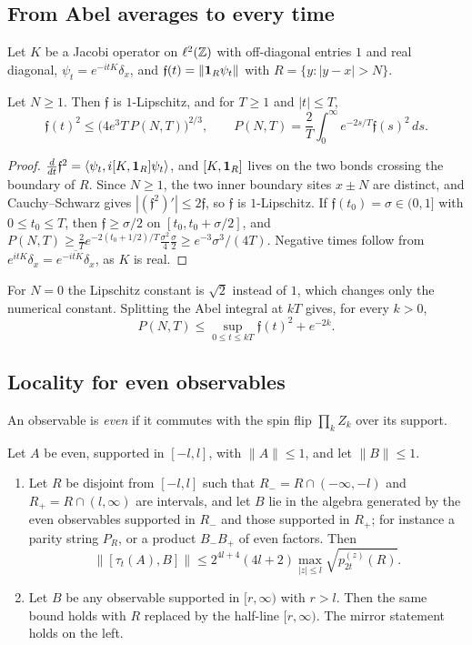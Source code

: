 \subsection{From Abel averages to every time}

Let $K$ be a Jacobi operator on $\ell^2(\mathbb Z)$ with off-diagonal entries $1$ and real diagonal, $\psi_t=e^{-itK}\delta_x$, and $\mathfrak f(t)=\|\mathbf 1_R\psi_t\|$ with $R=\{y:|y-x|>N\}$.

\begin{lemma}\label{lem:abel}
Let $N\ge1$. Then $\mathfrak f$ is $1$-Lipschitz, and for $T\ge1$ and $|t|\le T$,
\[
\mathfrak f(t)^2\le\bigl(4e^3T\,P(N,T)\bigr)^{2/3},\qquad P(N,T)=\frac2T\int_0^\infty e^{-2s/T}\mathfrak f(s)^2\,ds .
\]
\end{lemma}

\begin{proof}
$\frac d{dt}\mathfrak f^2=\langle\psi_t,i[K,\mathbf 1_R]\psi_t\rangle$, and $[K,\mathbf 1_R]$ lives on the two bonds crossing the boundary of $R$. Since $N\ge1$, the two inner boundary sites $x\pm N$ are distinct, and Cauchy--Schwarz gives $|(\mathfrak f^2)'|\le2\mathfrak f$, so $\mathfrak f$ is $1$-Lipschitz. If $\mathfrak f(t_0)=\sigma\in(0,1]$ with $0\le t_0\le T$, then $\mathfrak f\ge\sigma/2$ on $[t_0,t_0+\sigma/2]$, and $P(N,T)\ge\frac2Te^{-2(t_0+1/2)/T}\frac{\sigma^2}4\frac\sigma2\ge e^{-3}\sigma^3/(4T)$. Negative times follow from $e^{itK}\delta_x=\overline{e^{-itK}\delta_x}$, as $K$ is real.
\end{proof}

For $N=0$ the Lipschitz constant is $\sqrt2$ instead of $1$, which changes only the numerical constant. Splitting the Abel integral at $kT$ gives, for every $k>0$,
\begin{equation}\label{eq:abelsplit}
P(N,T)\le\sup_{0\le t\le kT}\mathfrak f(t)^2+e^{-2k}.
\end{equation}

\subsection{Locality for even observables}

An observable is \emph{even} if it commutes with the spin flip $\prod_kZ_k$ over its support.

\begin{lemma}[Locality]\label{lem:locality}
Let $A$ be even, supported in $[-l,l]$, with $\|A\|\le1$, and let $\|B\|\le1$.
\begin{enumerate}
\item Let $R$ be disjoint from $[-l,l]$ such that $R_-=R\cap(-\infty,-l)$ and $R_+=R\cap(l,\infty)$ are intervals, and let $B$ lie in the algebra generated by the even observables supported in $R_-$ and those supported in $R_+$; for instance a parity string $P_R$, or a product $B_-B_+$ of even factors. Then
\[
\|[\tau_t(A),B]\|\le2^{4l+4}(4l+2)\max_{|z|\le l}\sqrt{p^{(z)}_{2t}(R)} .
\]
\item Let $B$ be any observable supported in $[r,\infty)$ with $r>l$. Then the same bound holds with $R$ replaced by the half-line $[r,\infty)$. The mirror statement holds on the left.
\end{enumerate}
\end{lemma}

